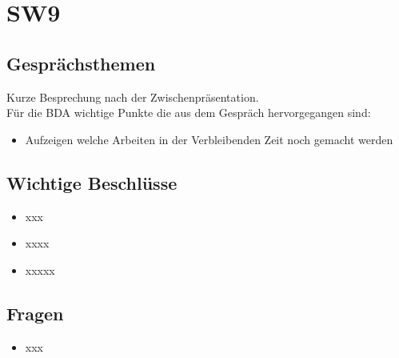 \documentclass[10pt,a4paper]{article}
\begin{document}
\section*{SW9}

\subsection*{Gesprächsthemen}

Kurze Besprechung nach der Zwischenpräsentation.\\

\vspace{10 mm}
Für die BDA wichtige Punkte die aus dem Gespräch hervorgegangen sind:
\begin{itemize}
	\item Aufzeigen welche Arbeiten  in der Verbleibenden Zeit noch gemacht werden
\end{itemize}

\subsection*{Wichtige Beschlüsse}

\begin{itemize}
	\item xxx
	\item xxxx
	\item xxxxx 
\end{itemize}
\subsection*{Fragen}
\begin{itemize}
	\item xxx
\end{itemize}
\end{document}
